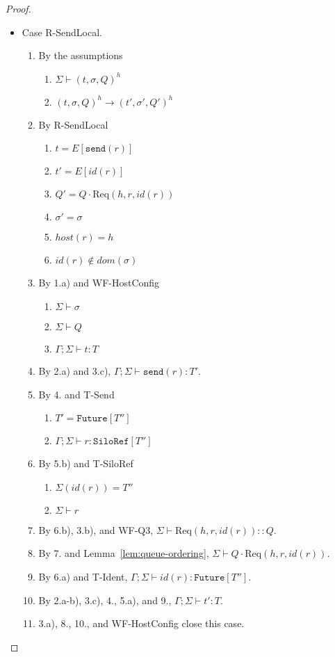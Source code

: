 \documentclass{article}
\theoremstyle{definition}
\newcommand{\Req}[3]{\text{Req}(#1, #2, #3)}
\begin{document}
\begin{proof}
\begin{itemize}
\item Case R-SendLocal.
\begin{enumerate}
\item By the assumptions
  \begin{enumerate}[label=(\alph*)]
  \item $\Sigma \vdash (t, \sigma, Q)^h$
  \item $(t, \sigma, Q)^h \longrightarrow (t', \sigma', Q')^h$
  \end{enumerate}
\item By R-SendLocal
  \begin{enumerate}[label=(\alph*)]
  \item $t = E[\texttt{send}(r)]$
  \item $t' = E[id(r)]$
  \item $Q' = Q \cdot {\Req h r {id(r)}}$
  \item $\sigma' = \sigma$
  \item $host(r) = h$
  \item $id(r) \notin dom(\sigma)$
  \end{enumerate}
\item By 1.a) and WF-HostConfig
  \begin{enumerate}[label=(\alph*)]
  \item $\Sigma \vdash \sigma$  %
  \item $\Sigma \vdash Q$
  \item $\Gamma ; \Sigma \vdash t : T$
  \end{enumerate}
\item By 2.a) and 3.c), $\Gamma ; \Sigma \vdash \texttt{send}(r) : T'$.
\item By 4. and T-Send
  \begin{enumerate}[label=(\alph*)]
  \item $T' = \texttt{Future}[T'']$
  \item $\Gamma ; \Sigma \vdash r : \texttt{SiloRef}[T'']$
  \end{enumerate}
\item By 5.b) and T-SiloRef
  \begin{enumerate}[label=(\alph*)]
  \item $\Sigma(id(r)) = T''$
  \item $\Sigma \vdash r$
  \end{enumerate}
\item By 6.b), 3.b), and WF-Q3, $\Sigma \vdash {\Req h r {id(r)}} :: Q$.
\item By 7. and Lemma~\ref{lem:queue-ordering}, $\Sigma \vdash Q \cdot {\Req h r {id(r)}}$.
\item By 6.a) and T-Ident, $\Gamma ; \Sigma \vdash id(r) : \texttt{Future}[T'']$.
\item By 2.a-b), 3.c), 4., 5.a), and 9., $\Gamma ; \Sigma \vdash t' : T$.
\item 3.a), 8., 10., and WF-HostConfig close this case.
\end{enumerate}


\end{itemize}
\end{proof}
\end{document}
